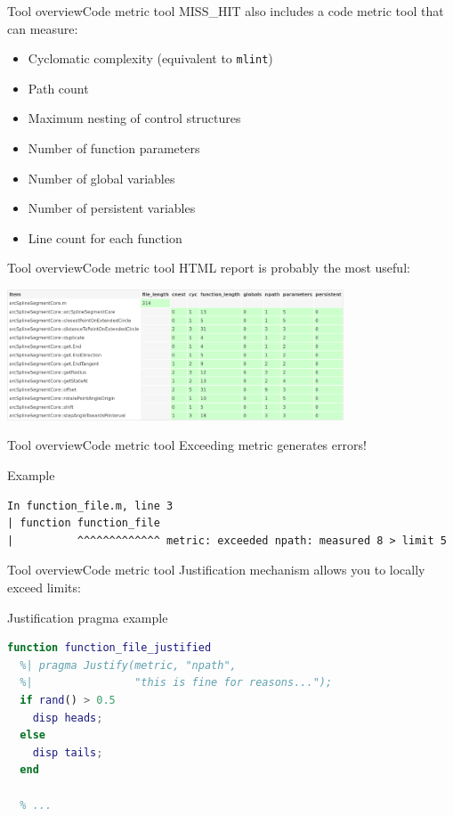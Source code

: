 \documentclass{beamer}
\begin{document}
\begin{frame}{Tool overview}{Code metric tool}
  MISS\_HIT also includes a code metric tool that can measure:
  \begin{itemize}
  \item Cyclomatic complexity (equivalent to {\tt mlint})
  \item Path count
  \item Maximum nesting of control structures
  \item Number of function parameters
  \item Number of global variables
  \item Number of persistent variables
  \item Line count for each function
  \end{itemize}
\end{frame}

\begin{frame}{Tool overview}{Code metric tool}
  HTML report is probably the most useful:
  \begin{center}
    \includegraphics[width=10cm]{metrics.png}
  \end{center}
\end{frame}

\begin{frame}[fragile]{Tool overview}{Code metric tool}
  Exceeding metric generates errors!
  \begin{block}{Example}
    \scriptsize
\begin{verbatim}
In function_file.m, line 3
| function function_file
|          ^^^^^^^^^^^^^ metric: exceeded npath: measured 8 > limit 5
\end{verbatim}
  \end{block}
\end{frame}

\begin{frame}[fragile]{Tool overview}{Code metric tool}
  Justification mechanism allows you to locally exceed limits:
\begin{block}{Justification pragma example}
\begin{lstlisting}[language=MATLAB]
function function_file_justified
  %| pragma Justify(metric, "npath",
  %|                "this is fine for reasons...");
  if rand() > 0.5
    disp heads;
  else
    disp tails;
  end

  % ...
\end{lstlisting}
\end{block}
\end{frame}
\end{document}
